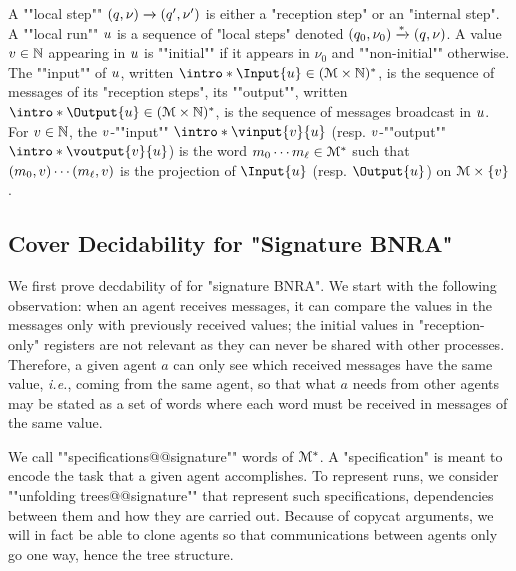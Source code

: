 	\AP A ""local step"" $(q,\nu) \xrightarrow{} (q',\nu')$ is either a "reception step" or an "internal step". 
	\AP A ""local run"" $u$ is a sequence of "local steps" denoted $(q_0, \nu_0) \xrightarrow{*} (q, \nu)$.
	A value $v \in \mathbb{N}$ appearing in $u$ is ""initial"" if it appears in $\nu_0$ and ""non-initial"" otherwise. 
	The ""input"" of $u$, written $\intro*\Input{\localrun} \in (\messages \times \nats)^*$, is the sequence of messages of its "reception steps", its ""output"", written $\intro*\Output{\localrun} \in (\messages \times \nats)^*$, is the sequence of messages broadcast in $u$. 
	For $v \in \mathbb{N}$, the $v$-""input"" $\intro*\vinput{\aval}{\localrun}$ (resp. $v$-""output"" $\intro*\voutput{\aval}{\localrun}$) is the word $m_0 \cdots m_{\ell} \in \mathcal{M}^*$ such that $(m_0, v) \cdots (m_{\ell}, v)$ is the projection of $\Input{\localrun}$ (resp. $\Output{\localrun}$) on $\mathcal{M} \times \{v\}$.

\subsection{Cover Decidability for "Signature BNRA"}
We first prove decdability of \COVER for "signature BNRA". We start with the following observation: when an agent receives messages, it can compare the values in the messages only with previously received values; the initial values in "reception-only" registers are not relevant as they can never be shared with other processes. Therefore, a given agent $a$ can only see which received messages have the same value, \emph{i.e.}, coming from the same agent, so that what $a$ needs from other agents may be stated as a set of words where each word must be received in messages of the same value. 

We call ""specifications@@signature"" words of $\mathcal{M}^*$. A "specification" is meant to encode the task that a given agent accomplishes. To represent runs, we consider ""unfolding trees@@signature"" that represent such specifications, dependencies between them and how they are carried out. Because of copycat arguments, we will in fact be able to clone agents so that communications between agents only go one way, hence the tree structure.

